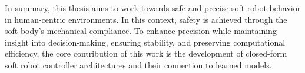 In summary, this thesis aims to work towards safe and precise soft robot behavior in human-centric environments. In this context, safety is achieved through the soft body’s mechanical compliance. To enhance precision while maintaining insight into decision-making, ensuring stability, and preserving computational efficiency, the core contribution of this work is the development of closed-form soft robot controller architectures and their connection to learned models. 
